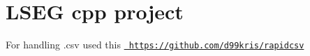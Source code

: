 \chapter{LSEG cpp project}
\hypertarget{index}{}\label{index}
\label{index_md__2home_2himala_2Documents_2gitRepos_2lseg__cpp_2README}%
%

\begin{DoxyItemize}
\item For handling .csv used this \href{https://github.com/d99kris/rapidcsv}{\texttt{ https\+://github.\+com/d99kris/rapidcsv}} 
\end{DoxyItemize}